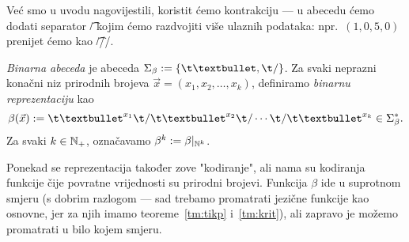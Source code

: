 
Već smo u uvodu nagovijestili, koristit ćemo kontrakciju --- u abecedu ćemo dodati separator \t/ kojim ćemo razdvojiti više ulaznih podataka: npr.\ $(1,0,5,0)$ prenijet ćemo kao \t{\textbullet//\textbullet\textbullet\textbullet\textbullet\textbullet/}.

\begin{definicija}[{name=[binarna abeceda i binarna reprezentacija]}]\label{def:beta}
\emph{Binarna abeceda} je abeceda $\Sigma_\beta:=\{\t\textbullet,\t/\}$. Za svaki neprazni konačni niz prirodnih brojeva $\vec x=(x_1,x_2,\dotsc,x_k)$, definiramo \emph{binarnu reprezentaciju} kao
\begin{equation}\label{eq:betadef}
    \beta(\vec x):=\t\textbullet^{x_1}\t/\t\textbullet^{x_2}\t/\dotsm\t/\t\textbullet^{x_k}\in\Sigma_\beta^*\text.
\end{equation}
Za svaki $k\in{\mathbb N}_+$, označavamo $\beta^k:=\beta|_{{\mathbb N}^k}$.
\end{definicija}

Ponekad se reprezentacija također zove "kodiranje", ali nama su kodiranja funkcije čije povratne vrijednosti su prirodni brojevi. Funkcija $\beta$ ide u suprotnom smjeru (s dobrim razlogom --- sad trebamo promatrati jezične funkcije kao osnovne, jer za njih imamo teoreme~\ref{tm:tikp} i~\ref{tm:krit}), ali zapravo je možemo promatrati u bilo kojem smjeru.

